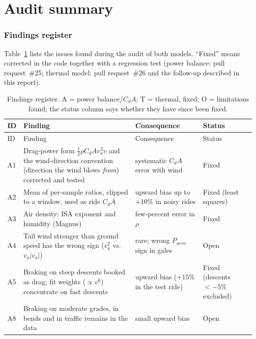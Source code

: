 \documentclass[11pt,a4paper]{article}
\newcommand{\CdA}{C_{\!d}A}
\begin{document}
\part{Audit summary}
\section{Findings register}
Table~\ref{tab:findings} lists the issues found during the audit of both models. ``Fixed'' means corrected in the code together with a regression test (power balance: pull request~\#25; thermal model: pull request~\#26 and the follow-up described in this report).

{\footnotesize\renewcommand{\arraystretch}{1.15}
\begin{longtable}{@{}l>{\raggedright\arraybackslash}p{6.3cm}>{\raggedright\arraybackslash}p{4.6cm}>{\raggedright\arraybackslash}p{2.4cm}@{}}
\caption{Findings register. A = power balance/\(\CdA\); T = thermal, fixed; O = limitations found; the status column says whether they have since been fixed.}\label{tab:findings}\\
\toprule
ID & Finding & Consequence & Status \\
\midrule
\endfirsthead
\toprule
ID & Finding & Consequence & Status \\
\midrule
\endhead
\bottomrule
\endfoot
A1 & Drag-power form \(\tfrac12\rho\CdA v_a^2 v\) and the wind-direction convention (direction the wind blows \emph{from}) corrected and tested & systematic \(\CdA\) error with wind & Fixed \\
A2 & Mean of per-sample ratios, clipped to a window, used as ride \(\CdA\) & upward bias up to \(+10\%\) in noisy rides & Fixed (least squares) \\
A3 & Air density: ISA exponent and humidity (Magnus) & few-percent error in \(\rho\) & Fixed \\
A4 & Tail wind stronger than ground speed has the wrong sign (\(v_a^2\) vs.\ \(v_a|v_a|\)) & rare; wrong \(P_{aero}\) sign in gales & Open \\
A5 & Braking on steep descents booked as drag; fit weights (\(\propto v^6\)) concentrate on fast descents & upward bias (\(+15\%\) in the test ride) & Fixed (descents \(<-5\%\) excluded) \\
A8 & Braking on moderate grades, in bends and in traffic remains in the data & small upward bias & Open \\

\end{longtable}}
\end{document}
